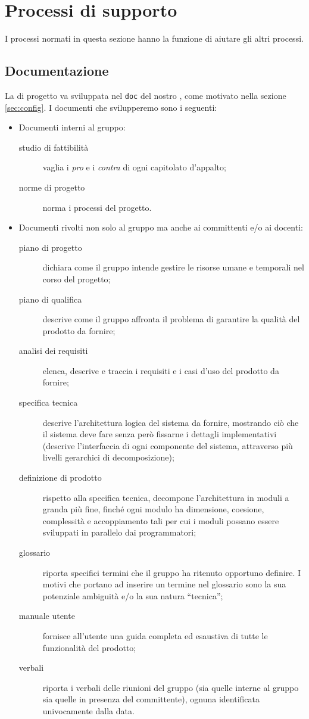 
\section{Processi di supporto} \label{sec:supporto}
I processi normati in questa sezione hanno la funzione di aiutare gli altri processi.

\subsection{Documentazione} \label{sec:doc}
La  di progetto va sviluppata nel  \texttt{doc} del nostro , come motivato nella sezione \ref{sec:config}. I documenti che svilupperemo sono i seguenti:
\begin{itemize}
	\item Documenti interni al gruppo:
	\begin{description}
		\item[studio di fattibilità] vaglia i \emph{pro} e i \emph{contra} di ogni capitolato d'appalto;
		\item[norme di progetto] norma i processi del progetto.
	\end{description}
	\item Documenti rivolti non solo al gruppo ma anche ai committenti e/o ai docenti:
	\begin{description}
		\item[piano di progetto] dichiara come il gruppo intende gestire le risorse umane e temporali nel corso del progetto;
		\item[piano di qualifica] descrive come il gruppo affronta il problema di garantire la qualità del prodotto da fornire;
		\item[analisi dei requisiti] elenca, descrive e traccia i requisiti e i casi d'uso del prodotto da fornire;
		\item[specifica tecnica] descrive l'architettura logica del sistema da fornire, mostrando ciò che il sistema deve fare senza però fissarne i dettagli implementativi (descrive l'interfaccia di ogni componente del sistema, attraverso più livelli gerarchici di decomposizione);
		\item[definizione di prodotto] rispetto alla specifica tecnica, decompone l'architettura in moduli a granda più fine, finché ogni modulo ha dimensione, coesione, complessità e accoppiamento tali per cui i moduli possano essere sviluppati in parallelo dai programmatori;
		\item[glossario] riporta specifici termini che il gruppo ha ritenuto opportuno definire. I motivi che portano ad inserire un termine nel glossario sono la sua potenziale ambiguità e/o la sua natura “tecnica”;
		\item[manuale utente] fornisce all'utente una guida completa ed esaustiva di tutte le funzionalità del prodotto;
		\item[verbali] riporta i verbali delle riunioni del gruppo (sia quelle interne al gruppo sia quelle in presenza del committente), ognuna identificata univocamente dalla data.
	\end{description}
\end{itemize}

